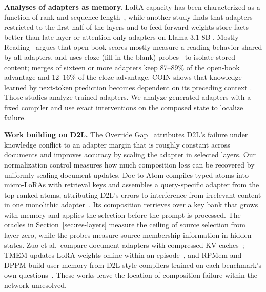 \documentclass{article}
\begin{document}
\textbf{Analyses of adapters as memory.} LoRA capacity has been characterized as a
function of rank and sequence length~\citep{xu2026lora}, while another study finds
that adapters restricted to the first half of the layers and to feed-forward weights
store facts better than late-layer or attention-only adapters on Llama-3.1-8B
\citep{back2026understanding}. Mostly Reading~\citep{pulici2026mostlyreading}
argues that open-book scores mostly measure a reading behavior shared by all
adapters, and uses cloze (fill-in-the-blank) probes~\citep{taylor1953cloze} to
isolate stored content; merges of sixteen or more adapters keep 87--89\% of the
open-book advantage and 12--16\% of the cloze advantage. COIN shows that knowledge
learned by next-token prediction becomes dependent on its preceding context
\citep{zhou2026coin}. Those studies analyze trained adapters. We analyze generated
adapters with a fixed compiler and use exact interventions on the composed state to
localize failure.

\textbf{Work building on D2L.} The Override Gap~\citep{cheng2026override} attributes
D2L's failure under knowledge conflict to an adapter margin that is roughly constant
across documents and improves accuracy by scaling the adapter in selected layers.
Our normalization control measures how much composition loss can be recovered
by uniformly scaling document updates. Doc-to-Atom compiles typed
atoms into micro-LoRAs with retrieval keys and assembles a query-specific adapter
from the top-ranked atoms, attributing D2L's errors to interference from irrelevant
content in one monolithic adapter~\citep{diao2026doctoatom}. Its composition
retrieves over a key bank that grows with memory and applies the selection before the
prompt is processed. The oracles in Section~\ref{sec:res-layers} measure the ceiling
of source selection from layer zero, while the probes measure source
membership information in hidden states. Zuo et al.\ compare document adapters
with compressed KV caches~\citep{zuo2026rethinking}; TMEM updates LoRA weights online
within an episode~\citep{ren2026scaling}, and RPMem and DPPM build user memory from
D2L-style compilers trained on each benchmark's own
questions~\citep{zhao2026rpmem,chen2026dppm}. These works leave the location of
composition failure within the network unresolved.
\end{document}
